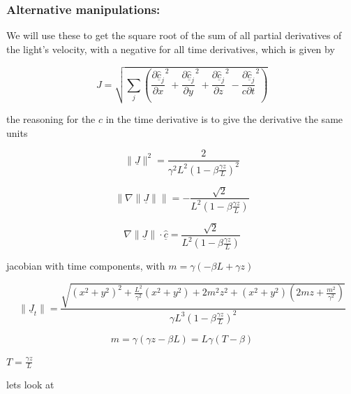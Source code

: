 \subsubsection{Alternative manipulations:}

We will use these to get the square root of the sum of all partial derivatives of the light's velocity, with a negative for all time derivatives, which is given by

\begin{equation}
	J = \sqrt{\sum_{j} \left( \frac{\partial \underline{\hat{c}}_j}{\partial x}^2 + \frac{\partial \underline{\hat{c}}_j}{\partial y}^2 + \frac{\partial \underline{\hat{c}}_j}{\partial z}^2 - \frac{\partial \underline{\hat{c}}_j}{c\partial t}^2 \right) }
\end{equation}

the reasoning for the $c$ in the time derivative is to give the derivative the same units


\begin{equation}
	\|\underline{J}\|^2 = \frac{ 2 }{\gamma^2  L^2 ( 1 - \beta \frac{\gamma z}{L} )^2 }
\end{equation}

\begin{equation}
	\left\| \nabla \|\underline{J}\| \right\|
	= - \frac{ \sqrt{2} }{ L^2 ( 1 - \beta \frac{\gamma z}{L}) }
\end{equation}

\begin{equation}
	\nabla \|\underline{J}\| \cdot \hat{\underline{c}} =  \frac{ \sqrt{2} }{ L^2 ( 1 - \beta \frac{\gamma z}{L} ) }
\end{equation}

jacobian with time components, with $m= \gamma (  -\beta L  + \gamma z  )$

\begin{equation}
	\|\underline{J}_t\| = \frac{ \sqrt{(x^2+y^2)^2 + \frac{L^2}{\gamma^2}(x^2+y^2) +2m^2z^2 + (x^2+y^2)(2mz +\frac{m^2}{\gamma^2}) }}{\gamma  L^3 ( 1 - \beta \frac{\gamma z}{L} )^2 }
\end{equation}

\begin{equation}
	m = \gamma (  \gamma z - \beta L ) = L \gamma (T-\beta)
\end{equation}

$T=\frac{\gamma z}{L}$

lets look at

